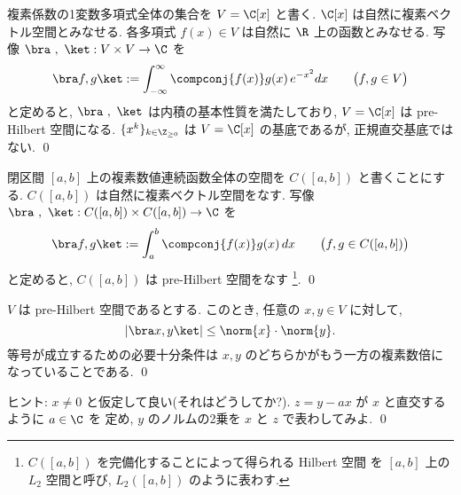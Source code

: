 \documentclass[12pt,twoside]{jarticle}
\begin{document}

\begin{question}[10点]
\label{q:Hermite-polyn-1}
  複素係数の1変数多項式全体の集合を $V = \C[x]$ と書く. 
  $\C[x]$ は自然に複素ベクトル空間とみなせる.
  各多項式 $f(x)\in V$ は自然に $\R$ 上の函数とみなせる.
  写像 $\bra\ ,\ \ket : V\times V\to\C$ を
  \begin{equation*}
    \bra f, g\ket := \int_{-\infty}^\infty \compconj{f(x)} g(x)\,e^{-x^2}dx
    \qquad \bigl(f,g\in V\bigr)
  \end{equation*}
  と定めると, $\bra\ ,\ \ket$ は内積の基本性質を満たしており, 
  $V = \C[x]$ は pre-Hilbert 空間になる. 
  $\{x^k\}_{k\in\Z_{\ge 0}}$ は $V = \C[x]$ の基底であるが, 正規直交基底では
  ない.
  \qed
\end{question}


\begin{question}[10点]
  閉区間 $[a,b]$ 上の複素数値連続函数全体の空間を $C([a,b])$ と書くことにす
  る. $C([a,b])$ は自然に複素ベクトル空間をなす.
  写像 $\bra\ ,\ \ket : C([a,b])\times C([a,b])\to\C$ を
  \begin{equation*}
    \bra f, g\ket := \int_a^b \compconj{f(x)} g(x)\,dx
    \qquad \bigl(f,g\in C([a,b])\bigr)
  \end{equation*}
  と定めると, $C([a,b])$ は pre-Hilbert 空間をなす%
  \footnote{$C([a,b])$ を完備化することによって得られる Hilbert 空間
    を $[a,b]$ 上の $L_2$ 空間と呼び, $L_2([a,b])$ のように表わす.}. \qed
\end{question}


\begin{question}
\label{q:Cauchy-Schwarz}
  $V$ は pre-Hilbert 空間であるとする. 
  このとき, 任意の $x,y\in V$ に対して,
  \begin{equation*}
    |\bra x, y\ket| \le \norm{x}\cdot\norm{y}.
  \end{equation*}
  等号が成立するための必要十分条件は $x,y$ のどちらかがもう一方の複素数倍に
  なっていることである.
  \qed
\end{question}

\noindent
ヒント: $x\ne0$ と仮定して良い(それはどうしてか?).  
$z=y-ax$ が $x$ と直交するように $a\in\C$ を
定め, $y$ のノルムの2乗を $x$ と $z$ で表わしてみよ.
\qed
\end{document}
